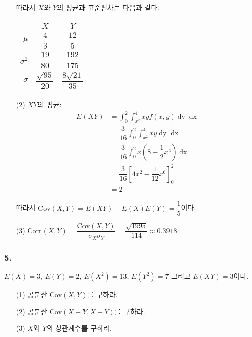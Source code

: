 \begin{itemize}
따라서 $X$와 $Y$의 평균과 표준편차는 다음과 같다.

\begin{center}
	\begin{tabular}{r|cc}
			 & $X$ & $Y$ \\
			 \hline
			$\mu$ & $\dfrac{4}{3}$ & $\dfrac{12}{5}$ \\
			\hline
			$\sigma^2$ & $\dfrac{19}{80}$ & $\dfrac{192}{175}$ \\
			\hline
			$\sigma$ & $\dfrac{\sqrt{95}}{20}$ & $\dfrac{8\sqrt{21}}{35}$ \\
			\hline
	\end{tabular}
\end{center}

  \item [(2)] $XY$의 평균:
\begin{align*}
	E\left(XY\right) &= \int_0^2 \int_{x^2}^4 xy f\left(x, y\right) \mathop{dy} \mathop{dx} \\
	&= \dfrac{3}{16} \int_0^2 \int_{x^2}^4 xy \mathop{dy} \mathop{dx} \\
	&= \dfrac{3}{16} \int_0^2 x\left(8 - \dfrac{1}{2}x^4\right) \mathop{dx} \\
	&= \dfrac{3}{16} \left[4x^2 - \dfrac{1}{12}x^6\right]_0^2 \\
	&= 2
\end{align*}

따라서 $\mathrm{Cov}\left(X, Y\right) = E\left(XY\right) - E\left(X\right)E\left(Y\right) = \dfrac{1}{5}$이다.

  \item [(3)] $\mathrm{Corr}\left(X, Y\right) = \dfrac{\mathrm{Cov}\left(X, Y\right)}{\sigma_X \sigma_Y} = \dfrac{\sqrt{1995}}{114} \approx 0.3918$
\end{itemize}

\subsubsection{5.} $E\left(X\right)=3$, $E\left(Y\right)=2$, $E\left(X^2\right)=13$, $E\left(Y^2\right) = 7$ 그리고 $E\left(XY\right)=3$이다.

\begin{itemize}
  \item [(1)] 공분산 $\mathrm{Cov}\left(X, Y\right)$를 구하라.
  \item [(2)] 공분산 $\mathrm{Cov}\left(X-Y, X+Y\right)$를 구하라.
  \item [(3)] $X$와 $Y$의 상관계수를 구하라.
\end{itemize}

